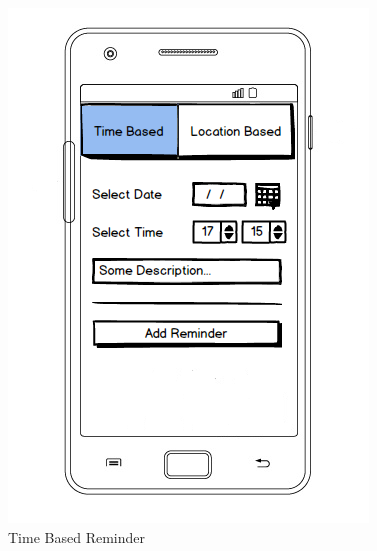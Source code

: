\documentclass[12pt]{article} %
\begin{document}
\begin{figure}[H]
\begin{minipage}[h]{0.45\linewidth}
\centering
\includegraphics[width=\textwidth]{Reminder1}
\caption{Time Based Reminder}
\label{fig:figure1}
\end{minipage}
\hspace{0.5cm}
\begin{minipage}[h]{0.45\linewidth}
\centering

\end{minipage}
\end{figure}
\end{document}
